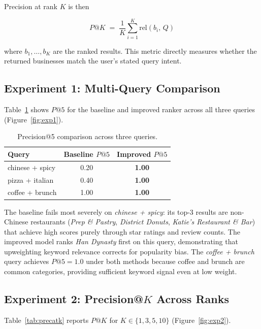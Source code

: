 \noindent Precision at rank $K$ is then

\begin{equation}
  P@K \;=\; \frac{1}{K}\sum_{i=1}^{K} \text{rel}(b_i,\, Q)
  \label{eq:precision}
\end{equation}

\noindent where $b_1, \ldots, b_K$ are the ranked results.
This metric directly measures whether the returned businesses
match the user's stated query intent.

\subsection{Experiment 1: Multi-Query Comparison}

Table~\ref{tab:multiquery} shows $P@5$ for the baseline and improved
ranker across all three queries (Figure~\ref{fig:exp1}).

\begin{table}[h]
\centering
\begin{tabular}{lcc}
\hline
\textbf{Query} & \textbf{Baseline $P@5$} & \textbf{Improved $P@5$} \\
\hline
chinese + spicy  & 0.20 & \textbf{1.00} \\
pizza + italian  & 0.40 & \textbf{1.00} \\
coffee + brunch  & 1.00 & \textbf{1.00} \\
\hline
\end{tabular}
\caption{Precision@5 comparison across three queries.}
\label{tab:multiquery}
\end{table}

The baseline fails most severely on \textit{chinese + spicy}: its top-3
results are non-Chinese restaurants (\textit{Prep \& Pastry},
\textit{District Donuts}, \textit{Katie's Restaurant \& Bar}) that
achieve high scores purely through star ratings and review counts.
The improved model ranks \textit{Han Dynasty} first on this query,
demonstrating that upweighting keyword relevance corrects for
popularity bias.
The \textit{coffee + brunch} query achieves $P@5 = 1.0$ under both
methods because coffee and brunch are common categories, providing
sufficient keyword signal even at low weight.

\subsection{Experiment 2: Precision@$K$ Across Ranks}

Table~\ref{tab:precatk} reports $P@K$ for $K \in \{1, 3, 5, 10\}$
(Figure~\ref{fig:exp2}).

